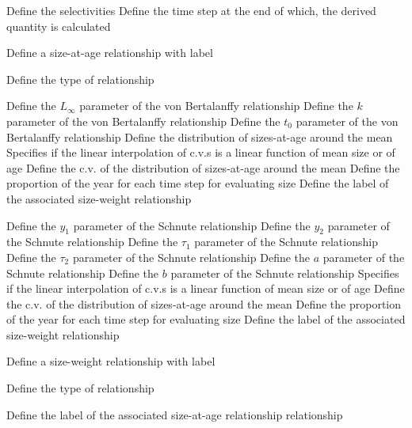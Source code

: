  {Define the selectivities}
 {Define the time step at the end of which, the derived quantity is calculated}
\par {} {Define a size-at-age relationship with label}\par
{} {Define the type of relationship}
\par\textbf{}\par
{} {Define the $L_\infty$ parameter of the von Bertalanffy relationship}
 {Define the $k$ parameter of the von Bertalanffy relationship}
 {Define the $t_0$ parameter of the von Bertalanffy relationship}
 {Define the distribution of sizes-at-age around the mean}
 {Specifies if the linear interpolation of c.v.s is a linear function of mean size or of age}
 {Define the c.v. of the distribution of sizes-at-age around the mean}
 {Define the proportion of the year for each time step for evaluating size}
 {Define the label of the associated size-weight relationship}
\par\textbf{}\par
{} {Define the $y_1$ parameter of the Schnute relationship}
 {Define the $y_2$ parameter of the Schnute relationship}
 {Define the $\tau_1$ parameter of the Schnute relationship}
 {Define the $\tau_2$ parameter of the Schnute relationship}
 {Define the $a$ parameter of the Schnute relationship}
 {Define the $b$ parameter of the Schnute relationship}
 {Specifies if the linear interpolation of c.v.s is a linear function of mean size or of age}
 {Define the c.v. of the distribution of sizes-at-age around the mean}
 {Define the proportion of the year for each time step for evaluating size}
 {Define the label of the associated size-weight relationship}
\par {} {Define a size-weight relationship with label}\par
{} {Define the type of relationship}
\par\textbf{}\par
\par\textbf{}\par
{} {Define the label of the associated size-at-age relationship relationship}
